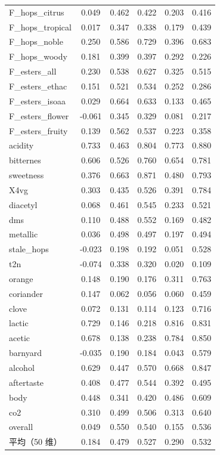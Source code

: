 \begin{longtable}{lccccc}
F\_hops\_citrus & 0.049 & 0.462 & 0.422 & 0.203 & 0.416 \\
F\_hops\_tropical & 0.017 & 0.347 & 0.338 & 0.179 & 0.439 \\
F\_hops\_noble & 0.250 & 0.586 & 0.729 & 0.396 & 0.683 \\
F\_hops\_woody & 0.181 & 0.399 & 0.397 & 0.292 & 0.226 \\
F\_esters\_all & 0.230 & 0.538 & 0.627 & 0.325 & 0.515 \\
F\_esters\_ethac & 0.151 & 0.521 & 0.534 & 0.252 & 0.286 \\
F\_esters\_isoaa & 0.029 & 0.664 & 0.633 & 0.133 & 0.465 \\
F\_esters\_flower & -0.061 & 0.345 & 0.329 & 0.081 & 0.217 \\
F\_esters\_fruity & 0.139 & 0.562 & 0.537 & 0.223 & 0.358 \\
acidity & 0.733 & 0.463 & 0.804 & 0.773 & 0.880 \\
bitternes & 0.606 & 0.526 & 0.760 & 0.654 & 0.781 \\
sweetness & 0.376 & 0.663 & 0.871 & 0.480 & 0.793 \\
X4vg & 0.303 & 0.435 & 0.526 & 0.391 & 0.784 \\
diacetyl & 0.068 & 0.461 & 0.545 & 0.233 & 0.521 \\
dms & 0.110 & 0.488 & 0.552 & 0.169 & 0.482 \\
metallic & 0.036 & 0.498 & 0.497 & 0.197 & 0.494 \\
stale\_hops & -0.023 & 0.198 & 0.192 & 0.051 & 0.528 \\
t2n & -0.074 & 0.338 & 0.320 & 0.020 & 0.109 \\
orange & 0.148 & 0.190 & 0.176 & 0.311 & 0.763 \\
coriander & 0.147 & 0.062 & 0.056 & 0.060 & 0.459 \\
clove & 0.072 & 0.131 & 0.114 & 0.123 & 0.716 \\
lactic & 0.729 & 0.146 & 0.218 & 0.816 & 0.831 \\
acetic & 0.678 & 0.138 & 0.238 & 0.784 & 0.850 \\
barnyard & -0.035 & 0.190 & 0.184 & 0.043 & 0.579 \\
alcohol & 0.629 & 0.447 & 0.570 & 0.668 & 0.847 \\
aftertaste & 0.408 & 0.477 & 0.544 & 0.392 & 0.495 \\
body & 0.448 & 0.341 & 0.420 & 0.486 & 0.609 \\
co2 & 0.310 & 0.499 & 0.506 & 0.313 & 0.640 \\
overall & 0.049 & 0.550 & 0.540 & 0.155 & 0.536 \\
\midrule
平均（50 维） & 0.184 & 0.479 & 0.527 & 0.290 & 0.532 \\
\bottomrule
\end{longtable}

